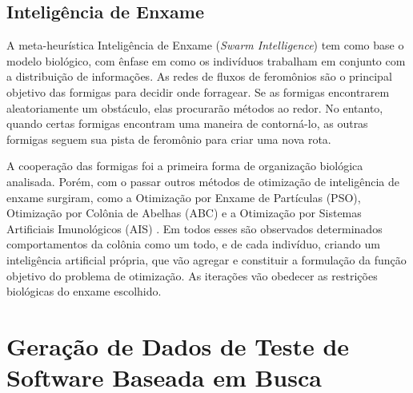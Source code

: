 \subsection{Inteligência de Enxame}

A meta-heurística Inteligência de Enxame (\textit{Swarm Intelligence}) tem como base o modelo biológico, com ênfase em como os indivíduos trabalham em conjunto com a distribuição de informações. As redes de fluxos de feromônios são o principal objetivo das formigas para decidir onde forragear. Se as formigas encontrarem aleatoriamente um obstáculo, elas procurarão métodos ao redor. No entanto, quando certas formigas encontram uma maneira de contorná-lo, as outras formigas seguem sua pista de feromônio para criar uma nova rota.

A cooperação das formigas foi a primeira forma de organização biológica analisada. Porém, com o passar outros métodos de otimização de inteligência de enxame surgiram, como a Otimização por Enxame de Partículas (PSO), Otimização por Colônia de Abelhas (ABC) e a Otimização por Sistemas Artificiais Imunológicos (AIS) \cite{blum2008swarm}. Em todos esses são observados determinados comportamentos da colônia como um todo, e de cada indivíduo, criando um inteligência artificial própria, que vão agregar e constituir a formulação da função objetivo do problema de otimização. As iterações vão obedecer as restrições biológicas do enxame escolhido.

\section{Geração de Dados de Teste de Software Baseada em Busca \label{sec:trabsSBST}}



